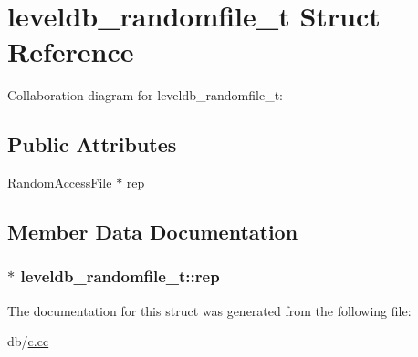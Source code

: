\hypertarget{structleveldb__randomfile__t}{\section{leveldb\-\_\-randomfile\-\_\-t Struct Reference}
\label{structleveldb__randomfile__t}
}


Collaboration diagram for leveldb\-\_\-randomfile\-\_\-t\-:
\subsection*{Public Attributes}
\begin{DoxyCompactItemize}
\item 
\hyperlink{classleveldb_1_1_random_access_file}{Random\-Access\-File} $\ast$ \hyperlink{structleveldb__randomfile__t_a66667ecc756a0ca312bbc94e2dfc27a5}{rep}
\end{DoxyCompactItemize}


\subsection{Member Data Documentation}
\hypertarget{structleveldb__randomfile__t_a66667ecc756a0ca312bbc94e2dfc27a5}{
\subsubsection[{rep}]{$\ast$ leveldb\-\_\-randomfile\-\_\-t\-::rep}}\label{structleveldb__randomfile__t_a66667ecc756a0ca312bbc94e2dfc27a5}


The documentation for this struct was generated from the following file\-:\begin{DoxyCompactItemize}
\item 
db/\hyperlink{c_8cc}{c.\-cc}\end{DoxyCompactItemize}

